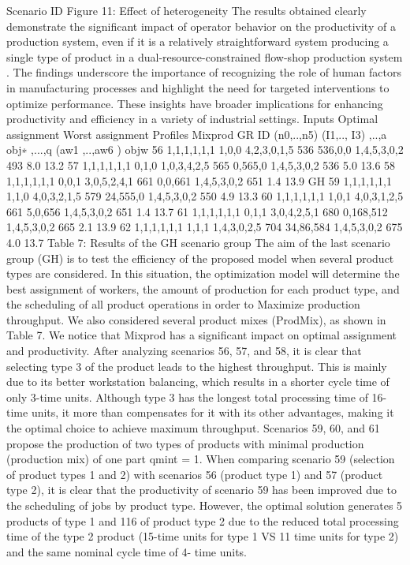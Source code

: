 Scenario ID
Figure 11: Effect of heterogeneity
The results obtained clearly demonstrate the significant impact of operator behavior on the productivity of a production system, even if it is a relatively straightforward system producing a single type of product in a dual-resource-constrained flow-shop production system . The findings underscore the importance of recognizing the role of human factors in manufacturing processes and highlight the need for targeted interventions to optimize performance. These insights have broader implications for enhancing productivity and efficiency in a variety of industrial settings.
		Inputs	Optimal assignment	Worst assignment		
		Profiles	Mixprod				
GR	ID	(n0,..,n5)	(I1,.., I3)	 ,..,a 	obj∗	 ,...,q 	(aw1 ,..,aw6 )	objw	%
	56	1,1,1,1,1,1	1,0,0	4,2,3,0,1,5	536	536,0,0	1,4,5,3,0,2	493	8.0	13.2
	57	1,1,1,1,1,1	0,1,0	1,0,3,4,2,5	565	0,565,0	1,4,5,3,0,2	536	5.0	13.6
	58	1,1,1,1,1,1	0,0,1	3,0,5,2,4,1	661	0,0,661	1,4,5,3,0,2	651	1.4	13.9
GH	59	1,1,1,1,1,1	1,1,0	4,0,3,2,1,5	579	24,555,0	1,4,5,3,0,2	550	4.9	13.3
	60	1,1,1,1,1,1	1,0,1	4,0,3,1,2,5	661	5,0,656	1,4,5,3,0,2	651	1.4	13.7
	61	1,1,1,1,1,1	0,1,1	3,0,4,2,5,1	680	0,168,512	1,4,5,3,0,2	665	2.1	13.9
	62	1,1,1,1,1,1	1,1,1	1,4,3,0,2,5	704	34,86,584	1,4,5,3,0,2	675	4.0	13.7
Table 7: Results of the GH scenario group
The aim of the last scenario group (GH) is to test the efficiency of the proposed model when several product types are considered. In this situation, the optimization model will determine the best assignment of workers, the amount of production for each product type, and the scheduling of all product operations in order to Maximize production throughput. We also considered several product mixes (ProdMix), as shown in Table 7. We notice that Mixprod has a significant impact on optimal assignment and productivity.
After analyzing scenarios 56, 57, and 58, it is clear that selecting type 3 of the product leads to the highest throughput. This is mainly due to its better workstation balancing, which results in a shorter cycle time of only 3-time units. Although type 3 has the longest total processing time of 16-time units, it more than compensates for it with its other advantages, making it the optimal choice to achieve maximum throughput.
Scenarios 59, 60, and 61 propose the production of two types of products with minimal production (production mix) of one part qmint = 1. When comparing scenario 59 (selection of product types 1 and 2) with scenarios 56 (product type 1) and 57 (product type 2), it is clear that the productivity of scenario 59 has been improved due to the scheduling of jobs by product type. However, the optimal solution generates 5 products of type 1 and 116 of product type 2 due to the reduced total processing time of the type 2 product (15-time units for type 1 VS 11 time units for type 2) and the same nominal cycle time of 4- time units.
